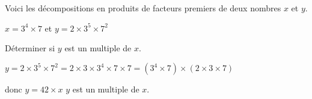     Voici les décompositions en produits de facteurs premiers de deux nombres $x$ et $y$.

    $x=3^4\times 7$ et $y=2\times 3^5\times 7^2$

    \smallskip
    Déterminer si $y$ est un multiple de $x$.

    $y=2\times 3^5\times 7^2 = 2\times 3\times 3^4\times 7\times 7 = (3^4\times 7)\times (2\times 3\times 7)$

    donc $y=42\times x$ $y$ est un multiple de $x$.
